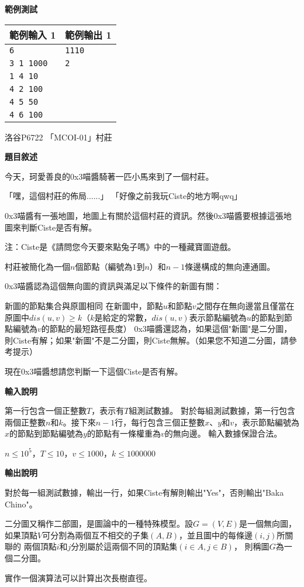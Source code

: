     \textbf{範例測試}

    \begin{tabular}{|m{7cm}|m{7cm}|}
        \hline
        範例輸入 1 & 範例輸出 1 \\
        \hline
        \verb|6|        & \verb|1110| \\
        \verb|3 1 1000| & \verb|2| \\
        \verb|1 4 10|   &  \\
        \verb|4 2 100|  &  \\
        \verb|4 5 50|   &  \\
        \verb|4 6 100|  & \\
        \hline
    \end{tabular}

    \problem 洛谷P6722 「MCOI-01」村莊

    \textbf{題目敘述}

    今天，珂愛善良的0x3喵醬騎著一匹小馬來到了一個村莊。

    「嘿，這個村莊的佈局......」
    「好像之前我玩Ciste的地方啊qwq」

    0x3喵醬有一張地圖，地圖上有關於這個村莊的資訊。然後0x3喵醬要根據這張地圖來判斷Ciste是否有解。

    注：Ciste是《請問您今天要來點兔子嗎》中的一種藏寶圖遊戲。

    村莊被簡化為一個$n$個節點（編號為$1$到$n$）和$n-1$條邊構成的無向連通圖。

    0x3喵醬認為這個無向圖的資訊與滿足以下條件的新圖有關：

    新圖的節點集合與原圖相同
    在新圖中，節點$u$和節點$v$之間存在無向邊當且僅當在原圖中$dis(u,v) \ge k$（$k$是給定的常數，$dis(u,v)$表示節點編號為$u$的節點到節點編號為$v$的節點的最短路徑長度）
    0x3喵醬還認為，如果這個"新圖"是二分圖，則Ciste有解；如果"新圖"不是二分圖，則Ciste無解。（如果您不知道二分圖，請參考提示）

    現在0x3喵醬想請您判斷一下這個Ciste是否有解。

    \textbf{輸入說明}

    第一行包含一個正整數$T$，表示有$T$組測試數據。
    對於每組測試數據，第一行包含兩個正整數$n$和$k$。接下來$n-1$行，每行包含三個正整數$x$、$y$和$v$，表示節點編號為$x$的節點到節點編號為$y$的節點有一條權重為$v$的無向邊。
    輸入數據保證合法。

    $n \le 10^5$，$T \le 10$，$v \le 1000$，$k \le 1000000$

    \textbf{輸出說明}

    對於每一組測試數據，輸出一行，如果Ciste有解則輸出"Yes"，否則輸出"Baka Chino"。

    \begin{tip}
        二分圖又稱作二部圖，是圖論中的一種特殊模型。設$G=(V,E)$是一個無向圖，
        如果頂點$V$可分割為兩個互不相交的子集$(A,B)$，並且圖中的每條邊$(i,j)$所關聯的
        兩個頂點$i$和$j$分別屬於這兩個不同的頂點集$(i \in A, j \in B)$，
        則稱圖$G$為一個二分圖。
    \end{tip}

    \problem 實作一個演算法可以計算出次長樹直徑。